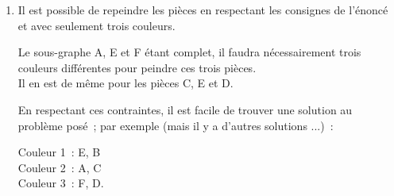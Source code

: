 \begin{corrige}
\begin{enumerate}
\begin{enumerate}[label=\alph*.]
               \item %
              
               Il est possible de repeindre les pièces en respectant les consignes de l'énoncé et avec seulement trois couleurs.
              
               Le sous-graphe A, E et F étant complet, il faudra nécessairement trois couleurs différentes pour peindre ces trois pièces.\\
               Il en est de même pour les pièces C, E et D.
              
               En respectant ces contraintes, il est facile de trouver une solution au problème posé~; par exemple (mais il y a d'autres solutions ...)~:
              
               Couleur 1~: E, B\\
               Couleur 2~: A, C\\
               Couleur 3~: F, D.\\
              
          \end{enumerate}
     \end{enumerate}
\end{corrige}
